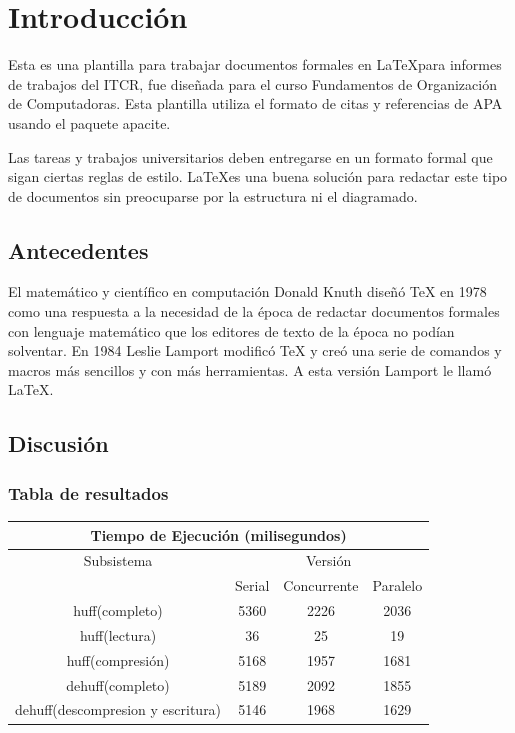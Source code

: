 \documentclass{report}
\begin{document}


\tableofcontents

\chapter{Introducción}\label{intro}

Esta es una plantilla para trabajar documentos formales en \LaTeX para informes de trabajos del ITCR, fue diseñada para el curso Fundamentos de Organización de Computadoras.
Esta plantilla utiliza el formato de citas y referencias de APA usando el paquete apacite.

Las tareas y trabajos universitarios deben entregarse en un formato formal que sigan ciertas reglas de estilo. 
\LaTeX es una buena solución para redactar este tipo de documentos sin preocuparse por la estructura ni el diagramado.

\section{Antecedentes}\label{antecedentes}

El matemático y científico en computación Donald Knuth diseñó TeX en 1978 como una respuesta a la necesidad de la época de redactar documentos formales con lenguaje matemático que los editores de texto de la época no podían solventar. En 1984 Leslie Lamport modificó TeX y creó una serie de comandos y macros más sencillos y con más herramientas. A esta versión Lamport le llamó \LaTeX \cite{lopez18}.


\section{Discusión}
\subsection{Tabla de resultados}
\begin{center}
	\begin{tabular}{|c|c|c|c|}		
		
\hline
\multicolumn{4}{|c|}{Tiempo de Ejecución (milisegundos)} \\
\hline
 Subsistema& \multicolumn{3}{|c|}{Versión} \\
 \hline
 & Serial & Concurrente & Paralelo\\
 \hline
huff(completo) & 5360& 2226 & 2036\\
 \hline
huff(lectura) &  36 & 25 & 19\\
 \hline
 huff(compresión) &  5168 & 1957 & 1681\\
 \hline
 dehuff(completo) & 5189 & 2092 & 1855\\
 \hline
 dehuff(descompresion y escritura) & 5146 & 1968 & 1629\\
 \hline
 
	\end{tabular}
\end{center}
\end{document}

